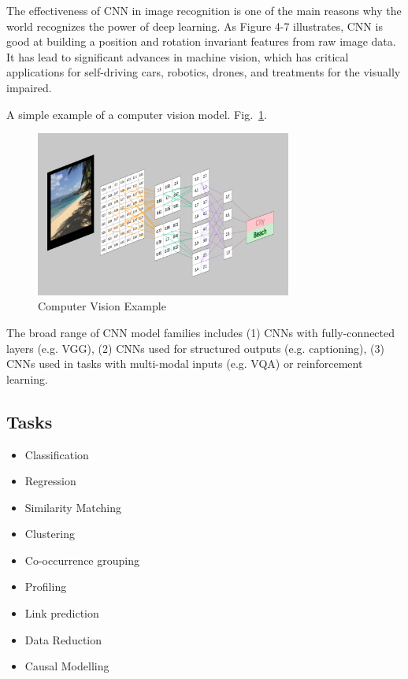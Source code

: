 The effectiveness of CNN in image recognition is one of the main reasons why the world recognizes the power of deep learning. As Figure 4-7 illustrates, CNN is good at building a position and rotation invariant features from raw image data. It has lead to significant advances in machine vision, which has critical applications for self-driving cars, robotics, drones, and treatments for the visually impaired.

A simple example of a computer vision model. Fig.~\ref{fig:CNN-2}.
\begin{figure}[htbp]
\centering
\includegraphics[width=0.75\textwidth]{images/CNN.png}
\caption{Computer Vision Example \protect\footnotemark}
\label{fig:CNN-2}
\end{figure}

The broad range of CNN model families includes (1) CNNs with fully-connected layers (e.g. VGG), (2) CNNs used for structured outputs (e.g. captioning), (3) CNNs used in tasks with multi-modal inputs (e.g. VQA) or reinforcement learning.
\vspace{15mm}

\subsection{Tasks}
\begin{itemize}
\item Classification
\item Regression
\item Similarity Matching
\item Clustering
\item Co-occurrence grouping
\item Profiling
\item Link prediction
\item Data Reduction
\item Causal Modelling
\end{itemize}

